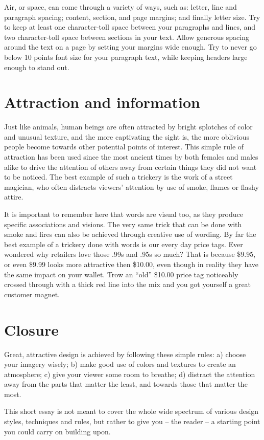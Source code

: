 Air, or space, can come through a variety of ways, such as: letter, line and
paragraph spacing; content, section, and page margins; and finally letter size. Try
to keep at least one character-toll space between your paragraphs and lines, and
two character-toll space between sections in your text. Allow generous spacing
around the text on a page by setting your margins wide enough. Try to never go
below 10 points font size for your paragraph text, while keeping headers large
enough to stand out.

\section*{Attraction and information}

Just like animals, human beings are often attracted by bright splotches of color
and unusual texture, and the more captivating the sight is, the more oblivious
people become towards other potential points of interest. This simple rule of
attraction has been used since the most ancient times by both females and males
alike to drive the attention of others away from certain things they did not want
to be noticed. The best example of such a trickery is the work of a street
magician, who often distracts viewers’ attention by use of smoke, flames or
flashy attire.

It is important to remember here that words are visual too, as they produce
specific associations and visions. The very same trick that can be done with
smoke and fires can also be achieved through creative use of wording. By far the
best example of a trickery done with words is our every day price tags. Ever
wondered why retailers love those .99s and .95s so much? That is because \$9.95, or
even \$9.99 looks more attractive then \$10.00, even though in reality they
have the same impact on your wallet. Trow an ``old'' \$10.00 price tag noticeably
crossed through with a thick red line into the mix and you got yourself a great
customer magnet.

\section*{Closure}

Great, attractive design is achieved by following these simple rules: a) choose
your imagery wisely; b) make good use of colors and textures to create an
atmosphere; c) give your viewer some room to breathe; d) distract the attention
away from the parts that matter the least, and towards those that matter the
most.

This short essay is not meant to cover the whole wide spectrum of various design
styles, techniques and rules, but rather to give you -- the reader -- a starting
point you could carry on building upon.
